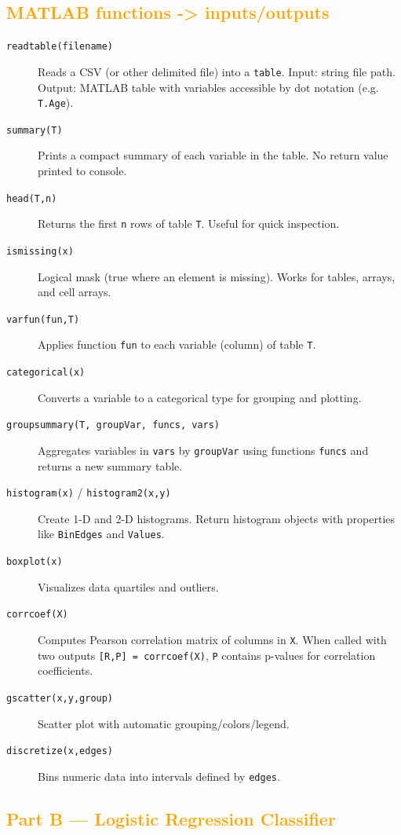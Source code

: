\documentclass[11pt,a4paper]{article}
\begin{document}
\subsection{\textcolor{orange}{ MATLAB functions -> inputs/outputs}}
\begin{description}
  \item[\texttt{readtable(filename)}] Reads a CSV (or other delimited file) into a \texttt{table}. Input: string file path. Output: MATLAB table with variables accessible by dot notation (e.g. \texttt{T.Age}).
  \item[\texttt{summary(T)}] Prints a compact summary of each variable in the table. No return value printed to console.
  \item[\texttt{head(T,n)}] Returns the first \texttt{n} rows of table \texttt{T}. Useful for quick inspection.
  \item[\texttt{ismissing(x)}] Logical mask (true where an element is missing). Works for tables, arrays, and cell arrays.
  \item[\texttt{varfun(fun,T)}] Applies function \texttt{fun} to each variable (column) of table \texttt{T}.
  \item[\texttt{categorical(x)}] Converts a variable to a categorical type for grouping and plotting.
  \item[\texttt{groupsummary(T, groupVar, funcs, vars)}] Aggregates variables in \texttt{vars} by \texttt{groupVar} using functions \texttt{funcs} and returns a new summary table.
  \item[\texttt{histogram(x)} / \texttt{histogram2(x,y)}] Create 1-D and 2-D histograms. Return histogram objects with properties like \texttt{BinEdges} and \texttt{Values}.
  \item[\texttt{boxplot(x)}] Visualizes data quartiles and outliers.
  \item[\texttt{corrcoef(X)}] Computes Pearson correlation matrix of columns in \texttt{X}. When called with two outputs \texttt{[R,P] = corrcoef(X)}, \texttt{P} contains p-values for correlation coefficients.
  \item[\texttt{gscatter(x,y,group)}] Scatter plot with automatic grouping/colors/legend.
  \item[\texttt{discretize(x,edges)}] Bins numeric data into intervals defined by \texttt{edges}.
\end{description}


\subsection{\textcolor{orange}{Part B — Logistic Regression Classifier}}
\end{document}
